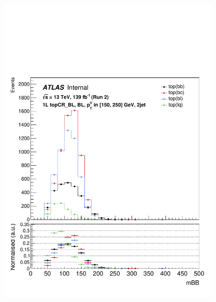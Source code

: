 \begin{figure}[h!]
\center
\includegraphics[scale=0.253]{Images/VH/top/OneLepton_top_1bltag2jet_topCR_BL_150_250ptv_mBB.pdf}

\end{figure}
